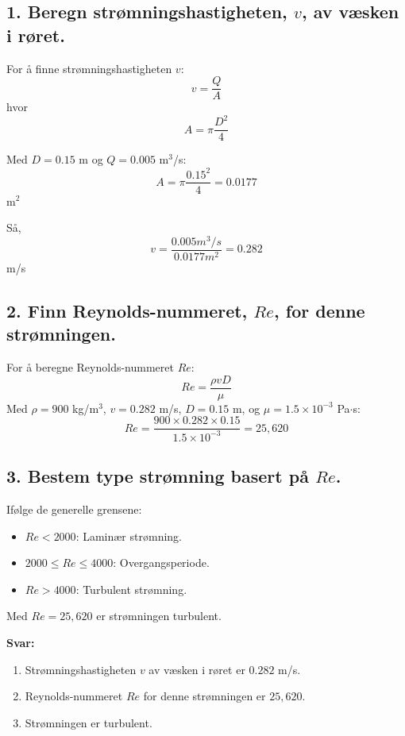 







\subsection*{1. Beregn strømningshastigheten, \( v \), av væsken i røret.}
For å finne strømningshastigheten \( v \):
\[ v = \frac{Q}{A} \]
hvor
\[ A = \pi \frac{D^2}{4} \]

Med \( D = 0.15 \) m og \( Q = 0.005 \) m\(^3\)/s:
\[ A = \pi \frac{0.15^2}{4} = 0.0177 \] m\(^2\)

Så,
\[ v = \frac{0.005  m^3/s}{0.0177 m^2} = 0.282 \] m/s

\subsection*{2. Finn Reynolds-nummeret, \( Re \), for denne strømningen.}
For å beregne Reynolds-nummeret \( Re \):
\[ Re = \frac{\rho v D}{\mu} \]
Med \( \rho = 900 \) kg/m\(^3\), \( v = 0.282 \) m/s, \( D = 0.15 \) m, og \( \mu = 1.5 \times 10^{-3} \) Pa\(\cdot\)s:
\[ Re = \frac{900 \times 0.282 \times 0.15}{1.5 \times 10^{-3}} = 25,620 \]

\subsection*{3. Bestem type strømning basert på \( Re \).}
Ifølge de generelle grensene:
\begin{itemize}
    \item \( Re < 2000 \): Laminær strømning.
    \item \( 2000 \leq Re \leq 4000 \): Overgangsperiode.
    \item \( Re > 4000 \): Turbulent strømning.
\end{itemize}
Med \( Re = 25,620 \) er strømningen turbulent.

\textbf{Svar:}
\begin{enumerate}
    \item Strømningshastigheten \( v \) av væsken i røret er \( 0.282 \) m/s.
    \item Reynolds-nummeret \( Re \) for denne strømningen er \( 25,620 \).
    \item Strømningen er turbulent.
\end{enumerate}






